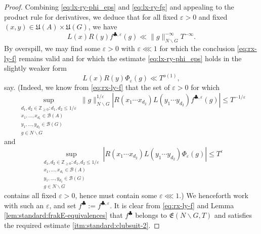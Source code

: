 \documentclass[reqno]{amsart}
\def\eps{\varepsilon}
\theoremstyle{plain} \newtheorem{theorem} {Theorem}
\theoremstyle{definition} \newtheorem{definition} [theorem] {Definition}
\theoremstyle{itplain} %
\numberwithin{equation}{section}
\numberwithin{theorem}{section}
\renewcommand{\geq}{\geqslant}
\renewcommand{\leq}{\leqslant}
\begin{document}
\begin{proof}
  Combining \eqref{eq:lx-ry-phi_eps} and \eqref{eq:lx-ry-fg} and appealing to the product rule for derivatives, we deduce that for all fixed $\eps > 0$ and fixed $(x,y) \in \mathfrak{U}(A) \times \mathfrak{U}(G)$, we have
  \begin{equation}\label{eq:rx-ly-f}
    L(x) R(y) 
    f ^{\clubsuit, \eps }(g)
    \ll \|g\|_{N \backslash G}^{-\infty} T^{-\infty}.
  \end{equation}
  By overspill, we may find some $\eps > 0$ with $\eps \lll 1$ for which the conclusion \eqref{eq:rx-ly-f} remains valid and for which the estimate  \eqref{eq:lx-ry-phi_eps} holds in the slightly weaker form
  \begin{equation*}
    L(x) R(y) \Phi_\eps (g) \ll T^{o(1)},
  \end{equation*}
  say.
  (Indeed, we know from \eqref{eq:rx-ly-f} that the set of $\eps > 0$ for which
  \begin{equation*}
    \sup_{
      \substack{
        d_1,d_2 \in \mathbb{Z} _{\geq 0} :   d_1, d_2 \leq 1/\eps \\
        x_1,\dotsc, x_{d_1} \in \mathcal{B}(A) \\
        y_1,\dotsc, y_{d_2} \in \mathcal{B}(G) \\
        g \in N \backslash G}
    }
    \|g\|_{N \backslash G}^{1/\eps}
    \left\lvert R(x_1 \dotsb x_{d_2}) L(y_1 \dotsb y_{d_2}) f^{\clubsuit,\eps}(g) \right\rvert \leq T^{-1/\eps}
  \end{equation*}
  and
  \begin{equation*}
    \sup_{
      \substack{
        d_1,d_2 \in \mathbb{Z} _{\geq 0} :   d_1, d_2 \leq 1/\eps \\
        x_1,\dotsc, x_{d_1} \in \mathcal{B}(A) \\
        y_1,\dotsc, y_{d_2} \in \mathcal{B}(G) \\
        g \in N \backslash G}
    }
    \left\lvert R(x_1 \dotsb x_{d_2}) L(y_1 \dotsb y_{d_2}) \Phi_\eps (g)  \right\rvert \leq T^{\eps}
  \end{equation*}
  contains all fixed $\eps > 0$, hence must contain some $\eps \lll 1$.)  We henceforth work with such an $\eps$, and set $f ^{\clubsuit} := f ^{\clubsuit, \eps }$.  It is clear from \eqref{eq:rx-ly-f} and Lemma \ref{lem:standard:frakE-equivalences} that $f ^{\clubsuit}$ belongs to $\mathfrak{E}(N \backslash G, T)$ and satisfies the required estimate \eqref{itm:standard:clubsuit-2}.


\end{proof}
\end{document}
